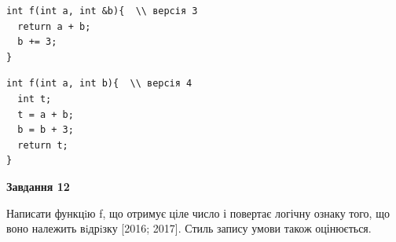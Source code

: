 \documentclass[12pt, ukrainian]{article}
\begin{document}
{\begin {large}
\begin{minipage}[t]{11.0cm}
\vspace{-8mm}\begin{verbatim}
int f(int a, int &b){  \\ версія 3
  return a + b;
  b += 3;
}
\end{verbatim}

\vspace{-8mm}\begin{verbatim}
int f(int a, int b){  \\ версія 4
  int t;
  t = a + b;
  b = b + 3;
  return t;
}
\end{verbatim}



\begin{center}
\textbf{Завдання 12}
\end{center}

Написати функцiю f, що отримує ціле число і повертає логічну ознаку того, що воно належить вiдрiзку [2016; 2017]. Стиль запису умови також оцінюється.\par

\end{minipage}

\end {large}}
\newpage
\end{document}

